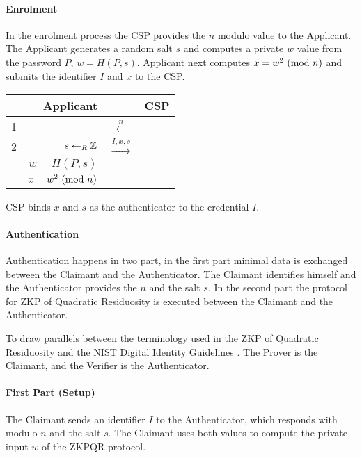 \paragraph{Enrolment} In the enrolment process the CSP provides the $n$ modulo value to the Applicant.
The Applicant generates a random salt $s$ and computes a private $w$ value from the password $P$, $w = H(P, s)$.
Applicant next computes $x = w^2 \ (\mathrm{mod}\ n)$ and submits the identifier $I$ and $x$ to the CSP.

\bigskip

\begin{center}
	\begin{tabular}{rrcl}
		& Applicant & & CSP\\
		\hline
		1 & & $\xleftarrow{n}$ \\
		2 & $s \leftarrow_R \Bbb{Z}$ & $\xrightarrow{I, x, s}$ \\ & $w = H(P, s)$ \\ &$x = w^2 \ (\mathrm{mod}\ n)$
	\end{tabular}
\end{center}

\bigskip

CSP binds $x$ and $s$ as the authenticator to the credential $I$.

\paragraph{Authentication}

Authentication happens in two part, in the first part minimal data is exchanged between the Claimant and the Authenticator. The Claimant identifies himself and the Authenticator provides the $n$ and the salt $s$. %
In the second part the protocol for ZKP of Quadratic Residuosity is executed between the Claimant and the Authenticator. %

To draw parallels between the terminology used in the ZKP of Quadratic Residuosity \cite{GMR} and the NIST Digital Identity Guidelines \cite{grassi2017}. The Prover is the Claimant, and the Verifier is the Authenticator.

\bigskip

\paragraph{First Part (Setup)}

The Claimant sends an identifier $I$ to the Authenticator, which responds with modulo $n$ and the salt $s$. The Claimant uses both values to compute the private input $w$ of the ZKPQR protocol.

